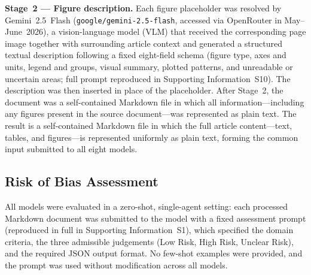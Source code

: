 \documentclass[../main.tex]{subfiles}
\begin{document}
\textbf{Stage~2 --- Figure description.}
Each figure placeholder was resolved by Gemini~2.5~Flash
(\texttt{google/gemini-2.5-flash}, accessed via OpenRouter in May--June~2026),
a vision-language model (VLM) that received the corresponding page image
together with surrounding article context and generated a structured textual
description following a fixed eight-field schema (figure type, axes and units,
legend and groups, visual summary, plotted patterns, and unreadable or uncertain
areas; full prompt reproduced in Supporting Information~S10).
The description was then inserted in place of the placeholder.
After Stage~2, the document was a self-contained Markdown file in which all
information---including any figures present in the source document---was represented as plain text.
The result is a self-contained Markdown file in which the full article
content---text, tables, and figures---is represented uniformly as plain text,
forming the common input submitted to all eight models.

\subsection{Risk of Bias Assessment}
\label{sec:rob-assessment}

All models were evaluated in a zero-shot, single-agent setting: each processed
Markdown document was submitted to the model with a fixed assessment prompt
(reproduced in full in Supporting Information~S1), which specified the domain
criteria, the three admissible judgements (Low Risk, High Risk, Unclear Risk),
and the required JSON output format.
No few-shot examples were provided, and the prompt was used without modification
across all models.
\end{document}
